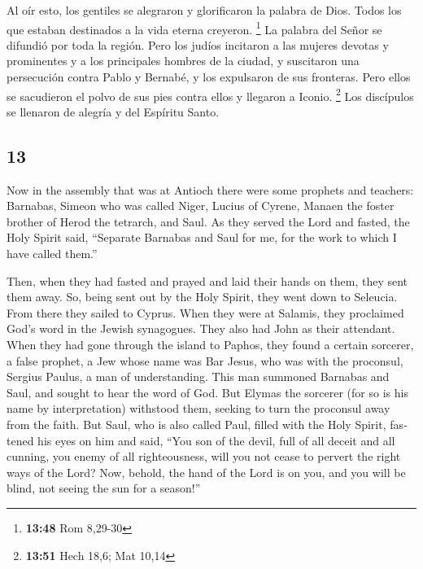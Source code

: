 \begin{paracol}{2}
 Al oír esto, los gentiles se alegraron y glorificaron la
palabra de Dios. Todos los que estaban destinados a la vida eterna
creyeron. \footnote{\textbf{13:48} Rom 8,29-30}  La
palabra del Señor se difundió por toda la región.  Pero
los judíos incitaron a las mujeres devotas y prominentes y a los
principales hombres de la ciudad, y suscitaron una persecución contra
Pablo y Bernabé, y los expulsaron de sus fronteras.  Pero
ellos se sacudieron el polvo de sus pies contra ellos y llegaron a
Iconio. \footnote{\textbf{13:51} Hech 18,6; Mat 10,14} 
Los discípulos se llenaron de alegría y del Espíritu Santo.

\switchcolumn
\begin{otherlanguage}{english}

\hypertarget{section-25}{%
\section{13}\label{section-25}}

 Now in the assembly that was at Antioch there were some
prophets and teachers: Barnabas, Simeon who was called Niger, Lucius of
Cyrene, Manaen the foster brother of Herod the tetrarch, and Saul.
 As they served the Lord and fasted, the Holy Spirit said,
``Separate Barnabas and Saul for me, for the work to which I have called
them.''

 Then, when they had fasted and prayed and laid their
hands on them, they sent them away.  So, being sent out by
the Holy Spirit, they went down to Seleucia. From there they sailed to
Cyprus.  When they were at Salamis, they proclaimed God's
word in the Jewish synagogues. They also had John as their attendant.
 When they had gone through the island to Paphos, they
found a certain sorcerer, a false prophet, a Jew whose name was Bar
Jesus,  who was with the proconsul, Sergius Paulus, a man
of understanding. This man summoned Barnabas and Saul, and sought to
hear the word of God.  But Elymas the sorcerer (for so is
his name by interpretation) withstood them, seeking to turn the
proconsul away from the faith.  But Saul, who is also
called Paul, filled with the Holy Spirit, fastened his eyes on him
 and said, ``You son of the devil, full of all deceit and
all cunning, you enemy of all righteousness, will you not cease to
pervert the right ways of the Lord?  Now, behold, the
hand of the Lord is on you, and you will be blind, not seeing the sun
for a season!''


\end{otherlanguage}
\end{paracol}
